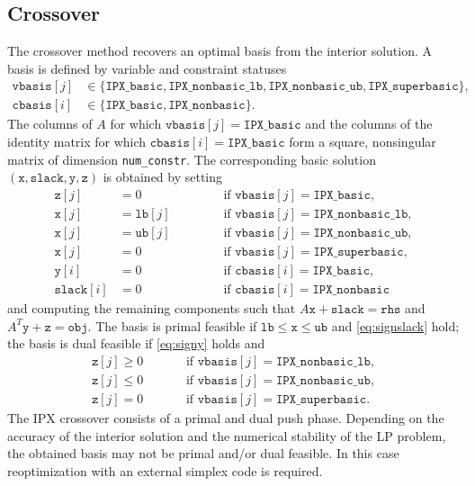 \documentclass{article}
\newcommand{\ct}{\texttt}
\newcommand{\rvec}[1]{\left(#1\right)}
\newcommand{\obj}{\ct{obj}}
\newcommand{\rhs}{\ct{rhs}}
\newcommand{\lb}{\ct{lb}}
\newcommand{\ub}{\ct{ub}}
\newcommand{\numconstr}{\ct{num\_constr}}
\newcommand{\x}{\ct{x}}
\newcommand{\slack}{\ct{slack}}
\newcommand{\y}{\ct{y}}
\newcommand{\z}{\ct{z}}
\newcommand{\vbasis}{\ct{vbasis}}
\newcommand{\cbasis}{\ct{cbasis}}
\newcommand{\basic}{\ct{IPX\_basic}}
\newcommand{\nonbasic}{\ct{IPX\_nonbasic}}
\newcommand{\nonbasiclb}{\ct{IPX\_nonbasic\_lb}}
\newcommand{\nonbasicub}{\ct{IPX\_nonbasic\_ub}}
\newcommand{\superbasic}{\ct{IPX\_superbasic}}
\begin{document}
\subsection{Crossover}
The crossover method recovers an optimal basis from the interior solution. A
basis is defined by variable and constraint statuses
\begin{align}
  \vbasis[j] &\in \{\basic, \nonbasiclb, \nonbasicub, \superbasic\}, \\
  \cbasis[i] &\in \{\basic, \nonbasic\}.
\end{align}
The columns of $A$ for which $\vbasis[j]=\basic$ and the columns of the identity
matrix for which $\cbasis[i]=\basic$ form a square, nonsingular matrix of
dimension \numconstr. The corresponding basic solution $\rvec{\x,\slack,\y,\z}$
is obtained by setting
\begin{subequations}
  \begin{alignat}{3}
    \z[j]&=0& &\quad& &\text{if $\vbasis[j]=\basic$}, \\
    \x[j]&=\lb[j]& && &\text{if $\vbasis[j]=\nonbasiclb$}, \\
    \x[j]&=\ub[j]& && &\text{if $\vbasis[j]=\nonbasicub$}, \\
    \x[j]&=0& &&      &\text{if $\vbasis[j]=\superbasic$}, \\
    \y[i]&=0& &&      &\text{if $\cbasis[i]=\basic$}, \\
    \slack[i]&=0& &&  &\text{if $\cbasis[i]=\nonbasic$}
  \end{alignat}
\end{subequations}
and computing the remaining components such that $A\x+\slack=\rhs$ and
$A^T\y+\z=\obj$. The basis is primal feasible if $\lb\le\x\le\ub$ and
\eqref{eq:signslack} hold; the basis is dual feasible if \eqref{eq:signy} holds
and
\begin{subequations}
  \begin{alignat}{2}
    \z[j]\ge0 &\quad& &\text{if $\vbasis[j]=\nonbasiclb$}, \\
    \z[j]\le0 &\quad& &\text{if $\vbasis[j]=\nonbasicub$}, \\
    \z[j]=0 &\quad& &\text{if $\vbasis[j]=\superbasic$}.
  \end{alignat}
\end{subequations}
The IPX crossover consists of a primal and dual push phase. Depending on the
accuracy of the interior solution and the numerical stability of the LP problem,
the obtained basis may not be primal and/or dual feasible. In this case
reoptimization with an external simplex code is required.
\end{document}
